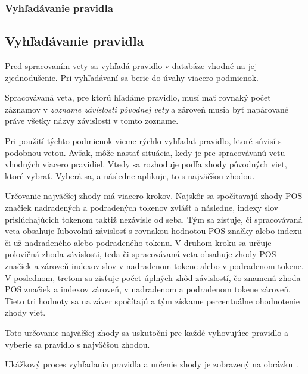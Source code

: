 %
%
{
	\subsubsection{Vyhľadávanie pravidla}
}
{
	\subsection{Vyhľadávanie pravidla}
}
\label{subsubsection:rule_lookup}
Pred spracovaním vety sa vyhľadá pravidlo v databáze vhodné na jej zjednodušenie. Pri vyhľadávaní sa berie do úvahy viacero podmienok.

Spracovávaná veta, pre ktorú hľadáme pravidlo, musí mať rovnaký počet záznamov v \textit{zozname závislosti pôvodnej vety} a zároveň musia byť napárované práve všetky názvy závislosti v tomto zozname.

Pri použití týchto podmienok vieme rýchlo vyhľadať pravidlo, ktoré súvisí s podobnou vetou. Avšak, môže nastať situácia, kedy je pre spracovávanú vetu vhodných viacero pravidiel. Vtedy sa rozhoduje podľa zhody pôvodných viet, ktoré vybrať. Vyberá sa, a následne aplikuje, to s najväčšou zhodou.

Určovanie najväčšej zhody má viacero krokov. Najskôr sa spočítavajú zhody POS značiek nadradených a podradených tokenov zvlášť a následne, indexy slov prislúchajúcich tokenom taktiž nezávisle od seba. Tým sa zisťuje, či spracovávaná veta obsahuje ľubovolnú závislosť s rovnakou hodnotou POS značky alebo indexu či už nadradeného alebo podradeného tokenu. V druhom kroku sa určuje polovičná zhoda závislosti, teda či spracovávaná veta obsahuje zhody POS značiek a zároveň indexov slov v nadradenom tokene alebo v podradenom tokene. V poslednom, treťom sa zisťuje počet úplných zhôd závislostí, čo znamená zhoda POS značiek a indexov zároveň, v nadradenom a podradenom tokene zároveň. Tieto tri hodnoty sa na záver spočítajú a tým získame percentuálne ohodnotenie zhody viet.

Toto určovanie najväčšej zhody sa uskutoční pre každé vyhovujúce pravidlo a vyberie sa pravidlo s najväčšou zhodou.

Ukážkový proces vyhľadania pravidla a určenie zhody je zobrazený na obrázku~.

